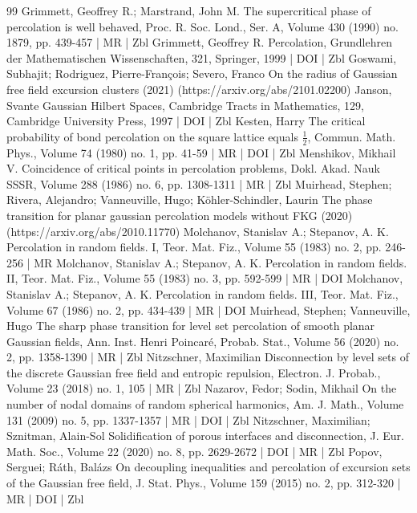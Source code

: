 \begin{thebibliography}{99}
Grimmett, Geoffrey R.; Marstrand, John M. The supercritical phase of percolation is well behaved, Proc. R. Soc. Lond., Ser. A, Volume 430 (1990) no. 1879, pp. 439-457 | MR | Zbl
Grimmett, Geoffrey R. Percolation, Grundlehren der Mathematischen Wissenschaften, 321, Springer, 1999 | DOI | Zbl
Goswami, Subhajit; Rodriguez, Pierre-François; Severo, Franco On the radius of Gaussian free field excursion clusters (2021) (https://arxiv.org/abs/2101.02200)
Janson, Svante Gaussian Hilbert Spaces, Cambridge Tracts in Mathematics, 129, Cambridge University Press, 1997 | DOI | Zbl
Kesten, Harry The critical probability of bond percolation on the square lattice equals $\frac{1}{2}$, Commun. Math. Phys., Volume 74 (1980) no. 1, pp. 41-59 | MR | DOI | Zbl
Menshikov, Mikhail V. Coincidence of critical points in percolation problems, Dokl. Akad. Nauk SSSR, Volume 288 (1986) no. 6, pp. 1308-1311 | MR | Zbl
Muirhead, Stephen; Rivera, Alejandro; Vanneuville, Hugo; Köhler-Schindler, Laurin The phase transition for planar gaussian percolation models without FKG (2020) (https://arxiv.org/abs/2010.11770)
Molchanov, Stanislav A.; Stepanov, A. K. Percolation in random fields. I, Teor. Mat. Fiz., Volume 55 (1983) no. 2, pp. 246-256 | MR
Molchanov, Stanislav A.; Stepanov, A. K. Percolation in random fields. II, Teor. Mat. Fiz., Volume 55 (1983) no. 3, pp. 592-599 | MR | DOI
Molchanov, Stanislav A.; Stepanov, A. K. Percolation in random fields. III, Teor. Mat. Fiz., Volume 67 (1986) no. 2, pp. 434-439 | MR | DOI
Muirhead, Stephen; Vanneuville, Hugo The sharp phase transition for level set percolation of smooth planar Gaussian fields, Ann. Inst. Henri Poincaré, Probab. Stat., Volume 56 (2020) no. 2, pp. 1358-1390 | MR | Zbl
Nitzschner, Maximilian Disconnection by level sets of the discrete Gaussian free field and entropic repulsion, Electron. J. Probab., Volume 23 (2018) no. 1, 105 | MR | Zbl
Nazarov, Fedor; Sodin, Mikhail On the number of nodal domains of random spherical harmonics, Am. J. Math., Volume 131 (2009) no. 5, pp. 1337-1357 | MR | DOI | Zbl
Nitzschner, Maximilian; Sznitman, Alain-Sol Solidification of porous interfaces and disconnection, J. Eur. Math. Soc., Volume 22 (2020) no. 8, pp. 2629-2672 | DOI | MR | Zbl
Popov, Serguei; Ráth, Balázs On decoupling inequalities and percolation of excursion sets of the Gaussian free field, J. Stat. Phys., Volume 159 (2015) no. 2, pp. 312-320 | MR | DOI | Zbl

\end{thebibliography}
